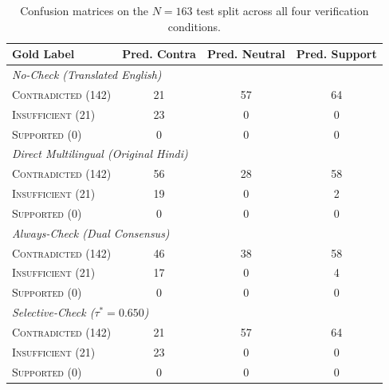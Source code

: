 \begin{table}[h]
\centering
\small
\begin{tabular}{lccc}
\toprule
\textbf{Gold Label} & \textbf{Pred. Contra} & \textbf{Pred. Neutral} & \textbf{Pred. Support} \\
\midrule
\multicolumn{4}{l}{\textit{No-Check (Translated English)}} \\
\textsc{Contradicted} (142) & 21 & 57 & 64 \\
\textsc{Insufficient} (21) & 23 & 0 & 0 \\
\textsc{Supported} (0) & 0 & 0 & 0 \\
\midrule
\multicolumn{4}{l}{\textit{Direct Multilingual (Original Hindi)}} \\
\textsc{Contradicted} (142) & 56 & 28 & 58 \\
\textsc{Insufficient} (21) & 19 & 0 & 2 \\
\textsc{Supported} (0) & 0 & 0 & 0 \\
\midrule
\multicolumn{4}{l}{\textit{Always-Check (Dual Consensus)}} \\
\textsc{Contradicted} (142) & 46 & 38 & 58 \\
\textsc{Insufficient} (21) & 17 & 0 & 4 \\
\textsc{Supported} (0) & 0 & 0 & 0 \\
\midrule
\multicolumn{4}{l}{\textit{Selective-Check ($\tau^*=0.650$)}} \\
\textsc{Contradicted} (142) & 21 & 57 & 64 \\
\textsc{Insufficient} (21) & 23 & 0 & 0 \\
\textsc{Supported} (0) & 0 & 0 & 0 \\
\bottomrule
\end{tabular}
\caption{Confusion matrices on the $N=163$ test split across all four verification conditions.}
\label{tab:app_confusion_matrices}
\end{table}

